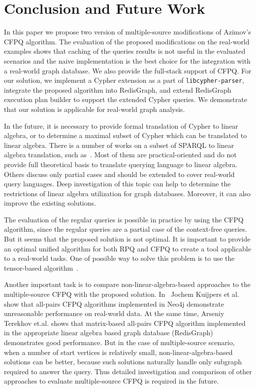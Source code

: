 \section{Conclusion and Future Work}
In this paper we propose two version of multiple-source modifications of Azimov's CFPQ algorithm.
The evaluation of the proposed modifications on the real-world examples shows that caching of the queries results is not useful in the evaluated scenarios and the naive implementation is the best choice for the integration with a real-world graph database.
We also provide the full-stack support of CFPQ.
For our solution, we implement a Cypher extension as a part of \texttt{libcypher-parser}, integrate the proposed algorithm into RedisGraph, and extend RedisGraph execution plan builder to support the extended Cypher queries.
We demonstrate that our solution is applicable for real-world graph analysis.

In the future, it is necessary to provide formal translation of Cypher to linear algebra, or to determine a maximal subset of Cypher which can be translated to linear algebra.
There is a number of works on a subset of SPARQL to linear algebra translation, such as~\cite{10.14778/3229863.3236239,10.1007/978-3-642-34002-4_36,10.1145/3302424.3303962,DBLP:journals/corr/MetzlerM15a}.
Most of them are practical-oriented and do not provide full theoretical basis to translate querying language to linear algebra.
Others discuss only partial cases and should be extended to cover real-world query languages.
Deep investigation of this topic can help to determine the restrictions of linear algebra utilization for graph databases.
Moreover, it can also improve the existing solutions.

The evaluation of the regular queries is possible in practice by using the CFPQ algorithm, since the regular queries are a partial case of the context-free queries.
But it seems that the proposed solution is not optimal.
It is important to provide an optimal unified algorithm for both RPQ and CFPQ to create a tool applicable to a real-world tasks.
One of possible way to solve this problem is to use the tensor-based algorithm~\cite{10.1007/978-3-030-54832-2_6}.

Another important task is to compare non-linear-algebra-based approaches to the multiple-source CFPQ with the proposed solution.
In~\cite{Kuijpers:2019:ESC:3335783.3335791} Jochem Kuijpers et al. show that all-pairs CFPQ algorithms implemented in Neo4j demonstrate unreasonable performance on real-world data.
At the same time, Arseniy Terekhov et.al. shows that matrix-based all-pairs CFPQ algorithm implemented in the appropriate linear algebra based graph database (RedisGraph) demonstrates good performance.
But in the case of multiple-source scenario, when a number of start vertices is relatively small, non-linear-algebra-based solutions can be better, because such solutions naturally handle only subgraph required to answer the query.
Thus detailed investigation and comparison of other approaches to evaluate multiple-source CFPQ is required in the future.